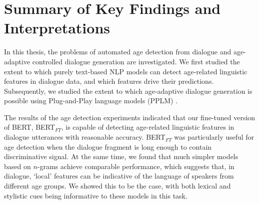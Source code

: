 \section{Summary of Key Findings and Interpretations}

In this thesis, the problems of automated age detection from dialogue and age-adaptive controlled dialogue generation are investigated. We first studied the extent to which purely text-based NLP models can detect age-related linguistic features in dialogue data, and which features drive their predictions. Subsequently, we studied the extent to which age-adaptive dialogue generation is possible using Plug-and-Play language models (PPLM) \citep{dathathri2019plug}.

The results of the age detection experiments indicated that our fine-tuned version of BERT, BERT$_{FT}$, is capable of detecting age-related linguistic features in dialogue utterances with reasonable accuracy. BERT$_{FT}$ was particularly useful for age detection when the dialogue fragment is long enough to contain discriminative signal. At the same time, we found that much simpler models based on $n$-grams achieve comparable performance, which suggests that, in dialogue, ‘local’ features can be indicative of the language of speakers from different age groups. We showed this to be the case, with both lexical and stylistic cues being informative to these models in this task.



